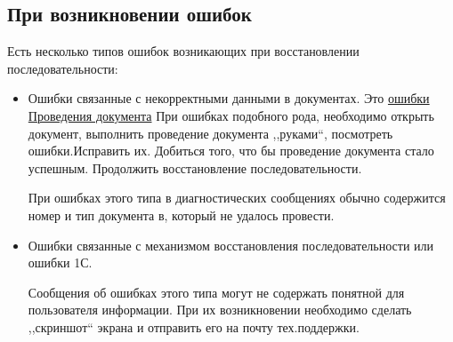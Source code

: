 \subsection{При возникновении ошибок}
	Есть несколько типов ошибок возникающих при восстановлении последовательности:
\begin{itemize}
\item Ошибки связанные с некорректными данными в документах. Это \underline{ошибки Проведения документа}  При ошибках подобного рода, необходимо открыть документ, выполнить проведение документа ,,руками``, посмотреть ошибки.Исправить их. Добиться того, что бы проведение документа стало успешным. Продолжить восстановление последовательности.\par При ошибках этого типа в диагностических сообщениях обычно содержится номер и тип документа в, который не удалось провести. 	
\item Ошибки связанные с  механизмом восстановления последовательности или ошибки 1С.\par Сообщения об ошибках этого типа могут не содержать понятной для пользователя информации. При их возникновении необходимо сделать ,,скриншот`` экрана и отправить его на почту тех.поддержки.   	



\end{itemize}		